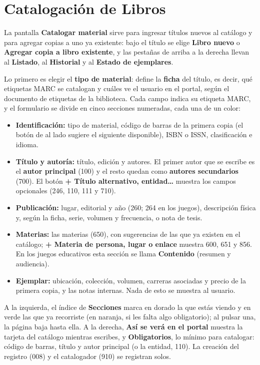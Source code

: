 \documentclass[11pt,a4paper]{report}
\newcommand{\requierepermiso}[1]{%
  \needspace{3\baselineskip}%
  \par\noindent\etiquetapermiso{REQUIERE PERMISO: #1}\par\vspace{6pt}%
}
\begin{document}
\section{Catalogación de Libros}

\requierepermiso{Catalogar libros}

La pantalla \textbf{Catalogar material} sirve para ingresar títulos
nuevos al catálogo y para agregar copias a uno ya existente: bajo el
título se elige \textbf{Libro nuevo} o \textbf{Agregar copia a libro
existente}, y las pestañas de arriba a la derecha llevan al
\textbf{Listado}, al \textbf{Historial} y al \textbf{Estado de
ejemplares}.

Lo primero es elegir el \textbf{tipo de material}: define la
\textbf{ficha} del título, es decir, qué etiquetas MARC se catalogan y
cuáles ve el usuario en el portal, según el documento de etiquetas de la
biblioteca. Cada campo indica su etiqueta MARC, y el formulario se divide
en cinco secciones numeradas, cada una de un color:

\begin{itemize}
  \item \textbf{Identificación:} tipo de material, código de barras de la
  primera copia (el botón de al lado sugiere el siguiente disponible), ISBN
  o ISSN, clasificación e idioma.
  \item \textbf{Título y autoría:} título, edición y autores. El primer
  autor que se escribe es el \textbf{autor principal} (100) y el resto
  quedan como \textbf{autores secundarios} (700). El botón
  \textbf{+ Título alternativo, entidad\ldots} muestra los campos
  opcionales (246, 110, 111 y 710).
  \item \textbf{Publicación:} lugar, editorial y año (260; 264 en los
  juegos), descripción física y, según la ficha, serie, volumen y
  frecuencia, o nota de tesis.
  \item \textbf{Materias:} las materias (650), con sugerencias de las que
  ya existen en el catálogo; \textbf{+ Materia de persona, lugar o enlace}
  muestra 600, 651 y 856. En los juegos educativos esta sección se llama
  \textbf{Contenido} (resumen y audiencia).
  \item \textbf{Ejemplar:} ubicación, colección, volumen, carreras
  asociadas y precio de la primera copia, y las notas internas. Nada de
  esto se muestra al usuario.
\end{itemize}

A la izquierda, el índice de \textbf{Secciones} marca en dorado la que
estás viendo y en verde las que ya recorriste (en naranja, si les falta
algo obligatorio); al pulsar una, la página baja hasta ella. A la derecha,
\textbf{Así se verá en el portal} muestra la tarjeta del catálogo mientras
escribes, y \textbf{Obligatorios}, lo mínimo para catalogar: código de
barras, título y autor principal (o la entidad, 110). La creación del
registro (008) y el catalogador (910) se registran solos.
\end{document}
